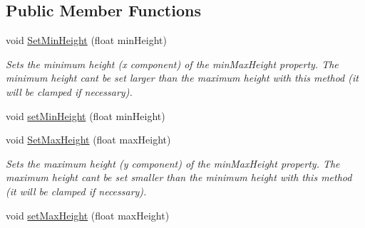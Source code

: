 \subsection*{Public Member Functions}
\begin{DoxyCompactItemize}
\item 
void \mbox{\hyperlink{class_leap_1_1_unity_1_1_interaction_1_1_interaction_button_aedfa4f61822e03652ac6678c4367fe48}{Set\+Min\+Height}} (float min\+Height)
\begin{DoxyCompactList}\small\item\em Sets the minimum height (x component) of the min\+Max\+Height property. The minimum height can\textquotesingle{}t be set larger than the maximum height with this method (it will be clamped if necessary). \end{DoxyCompactList}\item 
void \mbox{\hyperlink{class_leap_1_1_unity_1_1_interaction_1_1_interaction_button_a472b1d9f22f6c8621f3b6db7d28738e1}{set\+Min\+Height}} (float min\+Height)
\item 
void \mbox{\hyperlink{class_leap_1_1_unity_1_1_interaction_1_1_interaction_button_a6545b611053f312e6cf08cf0b5629fbe}{Set\+Max\+Height}} (float max\+Height)
\begin{DoxyCompactList}\small\item\em Sets the maximum height (y component) of the min\+Max\+Height property. The maximum height can\textquotesingle{}t be set smaller than the minimum height with this method (it will be clamped if necessary). \end{DoxyCompactList}\item 
void \mbox{\hyperlink{class_leap_1_1_unity_1_1_interaction_1_1_interaction_button_ad5b904b42f4a3a66875046120ad7edbe}{set\+Max\+Height}} (float max\+Height)
\end{DoxyCompactItemize}
